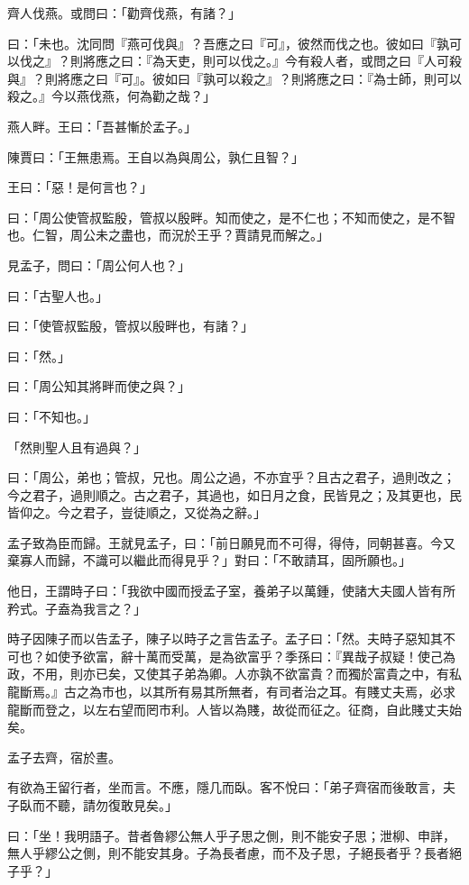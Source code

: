 \documentclass[12pt,a4paper]{ctexbook}
\begin{document}
齊人伐燕。或問曰：「勸齊伐燕，有諸？」\par
曰：「未也。沈同問『燕可伐與』？吾應之曰『可』，彼然而伐之也。彼如曰『孰可以伐之』？則將應之曰：『為天吏，則可以伐之。』今有殺人者，或問之曰『人可殺與』？則將應之曰『可』。彼如曰『孰可以殺之』？則將應之曰：『為士師，則可以殺之。』今以燕伐燕，何為勸之哉？」\par
燕人畔。王曰：「吾甚慚於孟子。」\par
陳賈曰：「王無患焉。王自以為與周公，孰仁且智？」\par
王曰：「惡！是何言也？」\par
曰：「周公使管叔監殷，管叔以殷畔。知而使之，是不仁也；不知而使之，是不智也。仁智，周公未之盡也，而況於王乎？賈請見而解之。」\par
見孟子，問曰：「周公何人也？」\par
曰：「古聖人也。」\par
曰：「使管叔監殷，管叔以殷畔也，有諸？」\par
曰：「然。」\par
曰：「周公知其將畔而使之與？」\par
曰：「不知也。」\par
「然則聖人且有過與？」\par
曰：「周公，弟也；管叔，兄也。周公之過，不亦宜乎？且古之君子，過則改之；今之君子，過則順之。古之君子，其過也，如日月之食，民皆見之；及其更也，民皆仰之。今之君子，豈徒順之，又從為之辭。」\par
孟子致為臣而歸。王就見孟子，曰：「前日願見而不可得，得侍，同朝甚喜。今又棄寡人而歸，不識可以繼此而得見乎？」對曰：「不敢請耳，固所願也。」\par
他日，王謂時子曰：「我欲中國而授孟子室，養弟子以萬鍾，使諸大夫國人皆有所矜式。子盍為我言之？」\par
時子因陳子而以告孟子，陳子以時子之言告孟子。孟子曰：「然。夫時子惡知其不可也？如使予欲富，辭十萬而受萬，是為欲富乎？季孫曰：『異哉子叔疑！使己為政，不用，則亦已矣，又使其子弟為卿。人亦孰不欲富貴？而獨於富貴之中，有私龍斷焉。』古之為市也，以其所有易其所無者，有司者治之耳。有賤丈夫焉，必求龍斷而登之，以左右望而罔市利。人皆以為賤，故從而征之。征商，自此賤丈夫始矣。\par
孟子去齊，宿於晝。\par
有欲為王留行者，坐而言。不應，隱几而臥。客不悅曰：「弟子齊宿而後敢言，夫子臥而不聽，請勿復敢見矣。」\par
曰：「坐！我明語子。昔者魯繆公無人乎子思之側，則不能安子思；泄柳、申詳，無人乎繆公之側，則不能安其身。子為長者慮，而不及子思，子絕長者乎？長者絕子乎？」\par
\end{document}
